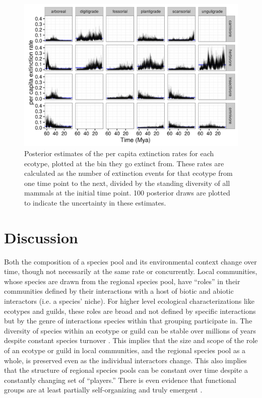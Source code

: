 \begin{figure}[ht]
  \centering
  \includegraphics[width=\textwidth,height=0.4\textheight,keepaspectratio=true]{chapter_coping/figure/death_eco}
  \caption[Estimated per capita extinction rates by mammal ecotype]{Posterior estimates of the per capita extinction rates for each ecotype, plotted at the bin they go extinct from. These rates are calculated as the number of extinction events for that ecotype from one time point to the next, divided by the standing diversity of all mammals at the initial time point. 100 posterior draws are plotted to indicate the uncertainty in these estimates.}
  \label{fig:ecotype_death}
\end{figure}

\section*{Discussion}

Both the composition of a species pool and its environmental context change over time, though not necessarily at the same rate or concurrently. Local communities, whose species are drawn from the regional species pool, have ``roles'' in their communities defined by their interactions with a host of biotic and abiotic interactors (i.e. a species' niche). For higher level ecological characterizations like ecotypes and guilds, these roles are broad and not defined by specific interactions but by the genre of interactions species within that grouping participate in. The diversity of species within an ecotype or guild can be stable over millions of years despite constant species turnover \citep{Jernvall2004,Slater2015c,Valkenburgh1999}. This implies that the size and scope of the role of an ecotype or guild in local communities, and the regional species pool as a whole, is preserved even as the individual interactors change. This also implies that the structure of regional species pools can be constant over time despite a constantly changing set of ``players.'' There is even evidence that functional groups are at least partially self-organizing and truly emergent \citep{Scheffer2006a}.

